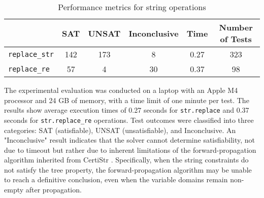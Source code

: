 \documentclass[a4paper,UKenglish,cleveref, autoref, anonymous, thm-restate]{lipics-v2021}
\begin{document}



\begin{table}[h]
  \centering
  \begin{tabular}{lccccc}
      \toprule
      & \textbf{SAT} & \textbf{UNSAT} & \textbf{Inconclusive} & \textbf{Time} & \textbf{Number of Tests} \\
      \midrule
      \texttt{replace\_str} & 142 & 173 & 8 & 0.27 & 323\\
      \texttt{replace\_re} & 57 & 4 & 30 & 0.37 & 98\\
      \bottomrule
  \end{tabular}
  \caption{Performance metrics for string operations}
  \label{tab:string_operations}
\end{table}

The experimental evaluation was conducted on a laptop with an Apple M4 processor and 24 GB of memory, with a time limit of one minute per test. 
The results show average execution times of 0.27 seconds for \texttt{str.replace} and 0.37 seconds for \texttt{str.replace\_re} operations. Test outcomes were classified into three categories: SAT (satisfiable), UNSAT (unsatisfiable), and Inconclusive.
%
An "Inconclusive" result indicates that the solver cannot determine satisfiability, not due to timeout but rather due to inherent limitations of the forward-propagation algorithm inherited from CertiStr \cite{cpp/KanLRS22}. Specifically, when the string constraints do not satisfy the tree property, the forward-propagation algorithm may be unable to reach a definitive conclusion, even when the variable domains remain non-empty after propagation.
\end{document}
